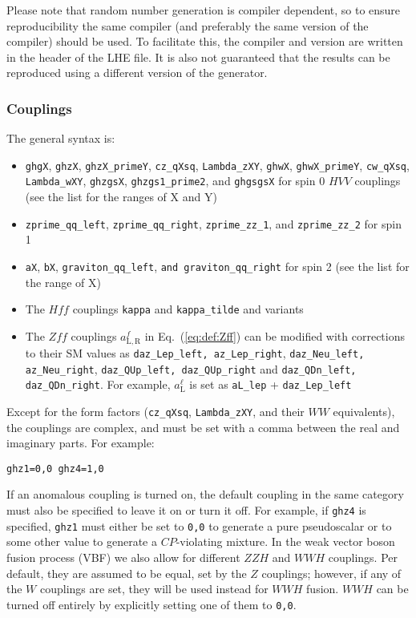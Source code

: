 \documentclass[aps,superscriptaddress,nofootinbib]{revtex4}
\begin{document}
\begin{itemize}
\begin{itemize}
Please note that random number generation is compiler dependent, so to ensure reproducibility the same compiler (and preferably the same version of the compiler) should be used.  To facilitate this, the compiler and version are written in the header of the LHE file.  It is also not guaranteed that the results can be reproduced using a different version of the generator.
\end{itemize}

\subsubsection{Couplings}
The general syntax is:
\begin{itemize}
\item \verb|ghgX|, \verb|ghzX|, \verb|ghzX_primeY|, \verb|cz_qXsq|, \verb|Lambda_zXY|, \verb|ghwX|, \verb|ghwX_primeY|, \verb|cw_qXsq|, \verb|Lambda_wXY|, \verb|ghzgsX|, \verb|ghzgs1_prime2|, and \verb|ghgsgsX| for spin 0 $HVV$ couplings (see the list for the ranges of X and Y)
\item \verb|zprime_qq_left|, \verb|zprime_qq_right|, \verb|zprime_zz_1|, and \verb|zprime_zz_2| for spin 1
\item \verb|aX|, \verb|bX|, \verb|graviton_qq_left|, \verb|and graviton_qq_right| for spin 2 (see the list for the range of X)
\item The $Hff$ couplings \verb|kappa| and \verb|kappa_tilde| and variants
\item The $Zff$ couplings $a^f_\mathrm{L,R}$ in Eq.~(\ref{eq:def:Zff}) can be modified with corrections to their SM values as \verb|daz_Lep_left, az_Lep_right|, \verb|daz_Neu_left, az_Neu_right|, \verb|daz_QUp_left, daz_QUp_right| and \verb|daz_QDn_left, daz_QDn_right|.
For example,  $a^\ell_\mathrm{L}$ is set as \verb|aL_lep| +  \verb|daz_Lep_left|
\end{itemize}
Except for the form factors (\verb|cz_qXsq|, \verb|Lambda_zXY|, and their $WW$ equivalents), the couplings are complex, and must be set with a comma between the real and imaginary parts.  For example:
\begin{verbatim}
ghz1=0,0 ghz4=1,0
\end{verbatim}
If an anomalous coupling is turned on, the default coupling in the same category must also be specified to leave it on or turn it off.  For example, if \verb|ghz4| is specified, \verb|ghz1| must either be set to \verb|0,0| to generate a pure pseudoscalar or to some other value to generate a $CP$-violating mixture.
In the weak vector boson fusion process (VBF) we also allow for different $ZZH$ and $WWH$ couplings.  Per default, they are assumed to be equal, set by the $Z$ couplings; however, if any of the $W$ couplings are set, they will be used instead for $WWH$ fusion.  $WWH$ can be turned off entirely by explicitly setting one of them to \verb|0,0|.

\end{itemize}
\end{document}
